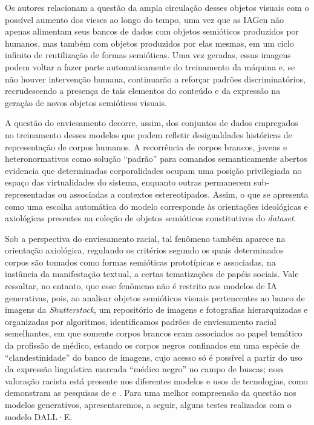 \documentclass[portuguese]{textolivre}
\begin{document}
Os autores relacionam a questão da ampla circulação desses objetos visuais com o possível aumento dos vieses ao longo do tempo, uma vez que as IAGen não apenas alimentam seus bancos de dados com objetos semióticos produzidos por humanos, mas também com objetos produzidos por elas mesmas, em um ciclo infinito de reutilização de formas semióticas. Uma vez geradas, essas imagens podem voltar a fazer parte automaticamente do treinamento da máquina e, se não houver intervenção humana, continuarão a reforçar padrões discriminatórios, recrudescendo a presença de tais elementos do conteúdo e da expressão na geração de novos objetos semióticos visuais.

A questão do enviesamento decorre, assim, dos conjuntos de dados empregados no treinamento desses modelos que podem refletir desigualdades históricas de representação de corpos humanos. A recorrência de corpos brancos, jovens e heteronormativos como solução “padrão” para comandos semanticamente abertos evidencia que determinadas corporalidades ocupam uma posição privilegiada no espaço das virtualidades do sistema, enquanto outras permanecem sub-representadas ou associadas a contextos estereotipados. Assim, o que se apresenta como uma escolha automática do modelo corresponde às orientações ideológicas e axiológicas presentes na coleção de objetos semióticos constitutivos do \textit{dataset}.

Sob a perspectiva do enviesamento racial, tal fenômeno também aparece na orientação axiológica, regulando os critérios segundo os quais determinados corpos são tomados como formas semióticas prototípicas e associadas, na instância da manifestação textual, a certas tematizações de papéis sociais. Vale ressaltar, no entanto, que esse fenômeno não é restrito aos modelos de IA generativas, pois, ao analisar objetos semióticos visuais pertencentes ao banco de imagens da \textit{Shutterstock}, um repositório de imagens e fotografias hierarquizadas e organizadas por algoritmos, identificamos \cite{moraes2025semioticista} padrões de enviesamento racial semelhantes, em que somente corpos brancos eram associados ao papel temático da profissão de médico, estando os corpos negros confinados em uma espécie de “clandestinidade” do banco de imagens, cujo acesso só é possível a partir do uso da expressão linguística marcada “médico negro” no campo de buscas; essa valoração racista está presente nos diferentes modelos e usos de tecnologias, como demonstram as pesquisas de \textcite{carrera2021racismo,noble2022algoritmos} e \textcite{pasquale2015black}. Para uma melhor compreensão da questão nos modelos generativos, apresentaremos, a seguir, alguns testes realizados com o modelo DALL·E.
\end{document}
